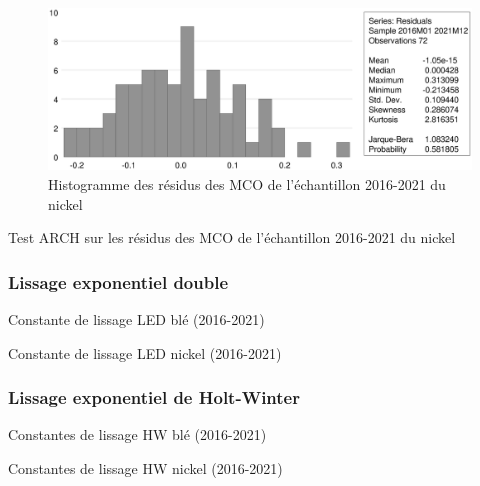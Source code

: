 \documentclass[12pt,a4paper]{article}
\begin{document}
\begin{figure}[H]
    \centering
    \includegraphics[width=\textwidth]{annexe/3_2_mco_hist_nickel.eps}
    \caption{Histogramme des résidus des MCO de l'échantillon 2016-2021 du nickel}
    \label{fig:mco_hist_nickel21}
\end{figure}

\begin{table}[H]
    \centering
    \caption{Test ARCH sur les résidus des MCO de l'échantillon 2016-2021 du nickel}
    \sffamily
    
    \label{tab:mco_homo_nickel19}
\end{table}

\subsubsection{Lissage exponentiel double}
\begin{table}[H]
    \centering
    \caption{Constante de lissage LED blé (2016-2021)}
    \sffamily
    
    \label{tab:led_ble21}
\end{table}

\begin{table}[H]
    \centering
    \caption{Constante de lissage LED nickel (2016-2021)}
    \sffamily
    
    \label{tab:led_nickel21}
\end{table}

\subsubsection{Lissage exponentiel de Holt-Winter}
\begin{table}[H]
    \centering
    \caption{Constantes de lissage HW blé (2016-2021)}
    \sffamily
    
    \label{tab:hw_ble}
\end{table}
\begin{table}[H]
    \centering
    \caption{Constantes de lissage HW nickel (2016-2021)}
    \sffamily
    
    \label{tab:hw_nickel}
\end{table}
\end{document}
